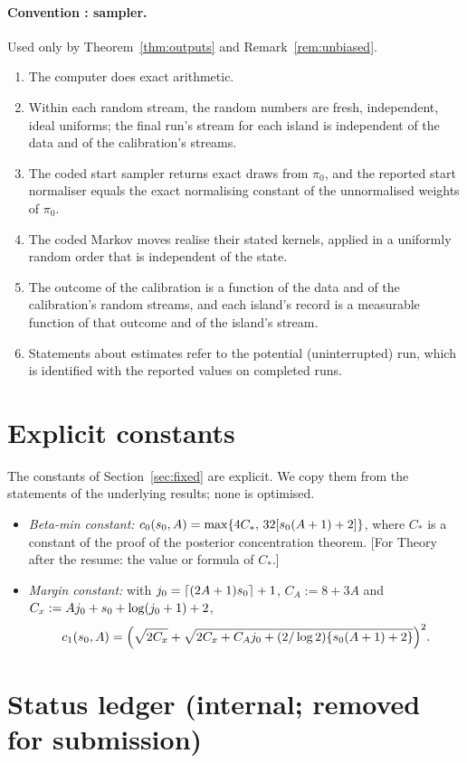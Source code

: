 \paragraph{Convention : sampler.} Used only by Theorem~\ref{thm:outputs} and Remark~\ref{rem:unbiased}.
\begin{enumerate}[label=(\roman*),leftmargin=2em,itemsep=1pt]
  \item The computer does exact arithmetic.
  \item Within each random stream, the random numbers are fresh, independent, ideal uniforms; the final run's stream for
    each island is independent of the data and of the calibration's streams.
  \item The coded start sampler returns exact draws from $\pi_0$, and the reported start normaliser equals the exact
    normalising constant of the unnormalised weights of $\pi_0$.
  \item The coded Markov moves realise their stated kernels, applied in a uniformly random order that is independent of
    the state.
  \item The outcome of the calibration is a function of the data and of the calibration's random streams, and each island's
    record is a measurable function of that outcome and of the island's stream.
  \item Statements about estimates refer to the potential (uninterrupted) run, which is identified with the reported
    values on completed runs.
\end{enumerate}

\section{Explicit constants}\label{app:constants}

The constants of Section~\ref{sec:fixed} are explicit. We copy them from the statements of the underlying results; none is
optimised.
\begin{itemize}[leftmargin=1.5em]
  \item \emph{Beta-min constant:} $c_0(s_0,A)=\max\{4C_*,\,32[s_0(A+1)+2]\}$, where $C_*$ is a constant of the proof of the
    posterior concentration theorem. [For Theory after the resume: the value or formula of $C_*$.]
  \item \emph{Margin constant:} with $j_0=\lceil(2A+1)s_0\rceil+1$, $C_A:=8+3A$ and
    $C_x:=Aj_0+s_0+\log(j_0+1)+2$,
    \[
      c_1(s_0,A)=\Big(\sqrt{2C_x}+\sqrt{2C_x+C_Aj_0+(2/\log2)\{s_0(A+1)+2\}}\Big)^2 .
    \]
\end{itemize}

\section{Status ledger (internal; removed for submission)}\label{app:status}



